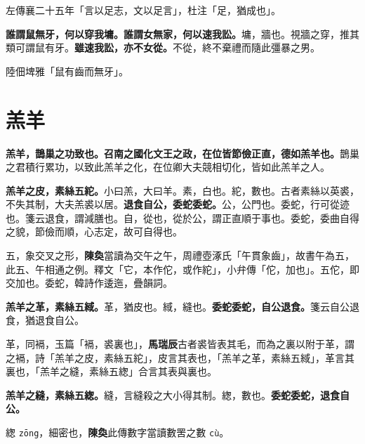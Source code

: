 \begin{quoting}左傳襄二十五年「言以足志，文以足言」，杜注「足，猶成也」。\end{quoting}

\textbf{誰謂鼠無牙，何以穿我墉。誰謂女無家，何以速我訟。}{\footnotesize 墉，牆也。視牆之穿，推其類可謂鼠有牙。}\textbf{雖速我訟，亦不女從。}{\footnotesize 不從，終不棄禮而隨此彊暴之男。}

\begin{quoting}陸佃埤雅「鼠有齒而無牙」。\end{quoting}

\section{羔羊}


\textbf{羔羊，鵲巢之功致也。召南之國化文王之政，在位皆節儉正直，德如羔羊也。}{\footnotesize 鵲巢之君積行累功，以致此羔羊之化，在位卿大夫競相切化，皆如此羔羊之人。}

\textbf{羔羊之皮，素絲五紽。}{\footnotesize 小曰羔，大曰羊。素，白也。紽，數也。古者素絲以英裘，不失其制，大夫羔裘以居。}\textbf{退食自公，委蛇委蛇。}{\footnotesize 公，公門也。委蛇，行可從迹也。箋云退食，謂減膳也。自，從也，從於公，謂正直順于事也。委蛇，委曲自得之貌，節儉而順，心志定，故可自得也。}

\begin{quoting}五，象交叉之形，\textbf{陳奐}當讀為交午之午，周禮壺涿氏「午貫象齒」，故書午為五，此五、午相通之例。釋文「它，本作佗，或作紽」，小弁傳「佗，加也」。五佗，即交加也。委蛇，韓詩作逶迤，疊韻詞。\end{quoting}

\textbf{羔羊之革，素絲五緎。}{\footnotesize 革，猶皮也。緎，縫也。}\textbf{委蛇委蛇，自公退食。}{\footnotesize 箋云自公退食，猶退食自公。}

\begin{quoting}革，同䙐，玉篇「䙐，裘裏也」，\textbf{馬瑞辰}古者裘皆表其毛，而為之裏以附于革，謂之䙐，詩「羔羊之皮，素絲五紽」，皮言其表也，「羔羊之革，素絲五緎」，革言其裏也，「羔羊之縫，素絲五緫」合言其表與裏也。\end{quoting}

\textbf{羔羊之縫，素絲五緫。}{\footnotesize 縫，言縫殺之大小得其制。緫，數也。}\textbf{委蛇委蛇，退食自公。}

\begin{quoting}緫 \texttt{zōng}，細密也，\textbf{陳奐}此傳數字當讀數罟之數 \texttt{cù}。\end{quoting}

